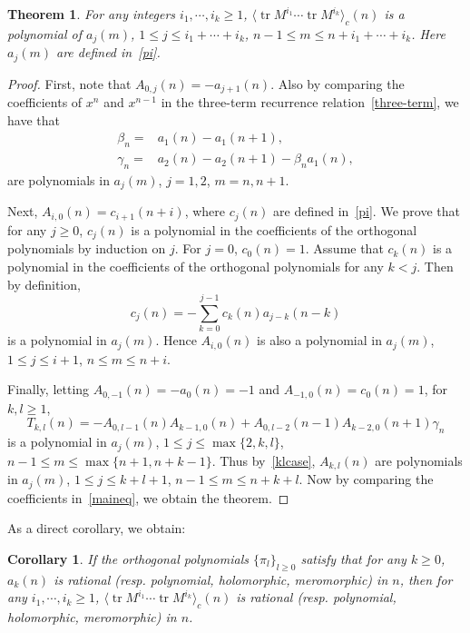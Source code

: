 \documentclass[a4paper]{article}
\theoremstyle{plain}
\newtheorem{thm}{Theorem}
\newtheorem{cor}{Corollary}
\theoremstyle{definition}
\DeclareMathOperator{\tr}{tr}
\begin{document}
\begin{thm} \label{rational}
		For any integers $i_1,\cdots,i_k\ge1$, $\langle\tr M^{i_1}\cdots\tr M^{i_k}\rangle_c(n)$ is a polynomial of $a_j(m)$, $1\le j\le i_1+\cdots+i_k$, $n-1\le m\le n+i_1+\cdots+i_k$. Here $a_j(m)$ are defined in~\eqref{pi}.
\end{thm}
\begin{proof}
	First, note that $A_{0,j}(n)=-a_{j+1}(n)$. Also by comparing the coefficients of $x^n$ and $x^{n-1}$ in the three-term recurrence relation~\eqref{three-term}, we have that
	\begin{align}
	\beta_n=&a_1(n)-a_1(n+1), \\
	\gamma_n=&a_2(n)-a_2(n+1)-\beta_na_1(n),
	\end{align}
	are polynomials in $a_j(m)$, $j=1,2$, $m=n,n+1$.
	
	Next, $A_{i,0}(n)=c_{i+1}(n+i)$, where $c_j(n)$ are defined in~\eqref{pi}. We prove that for any $j\ge0$, $c_{j}(n)$ is a polynomial in the coefficients of the orthogonal polynomials by induction on $j$. For $j=0$, $c_0(n)=1$. Assume that $c_k(n)$ is a polynomial in the coefficients of the orthogonal polynomials for any $k<j$. Then by definition,
	\begin{equation} \label{cnj}
		c_{j}(n)=-\sum_{k=0}^{j-1}c_{k}(n)a_{j-k}(n-k)
	\end{equation}
	is a polynomial in $a_j(m)$. Hence $A_{i,0}(n)$ is also a polynomial in $a_j(m)$, $1\le j\le i+1$, $n\le m\le n+i$.
	
	Finally, letting $A_{0,-1}(n)=-a_0(n)=-1$ and $A_{-1,0}(n)=c_0(n)=1$, for $k,l\ge1$,
	\begin{equation}
		T_{k,l}(n)=-A_{0,l-1}(n)A_{k-1,0}(n)+A_{0,l-2}(n-1)A_{k-2,0}(n+1)\gamma_n \label{tij}
	\end{equation}
	is a polynomial in $a_j(m)$, $1\le j\le\max\{2,k,l\}$, $n-1\le m\le\max\{n+1,n+k-1\}$. Thus by~\eqref{klcase}, $A_{k,l}(n)$ are polynomials in $a_j(m)$, $1\le j\le k+l+1$, $n-1\le m\le n+k+l$. Now by comparing the coefficients in~\eqref{maineq}, we obtain the theorem.
\end{proof}

As a direct corollary, we obtain:
	\begin{cor} \label{rational-cor}
		If the orthogonal polynomials $\{\pi_l\}_{l\ge0}$ satisfy that for any $k\ge0$, $a_k(n)$ is rational (resp. polynomial, holomorphic, meromorphic) in $n$, then for any $i_1,\cdots,i_k\ge1$, $\langle\tr M^{i_1}\cdots\tr M^{i_k}\rangle_c(n)$ is rational (resp. polynomial, holomorphic, meromorphic) in $n$.
	\end{cor}
\end{document}
